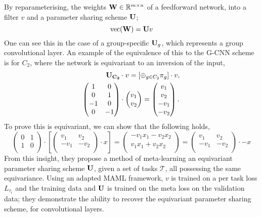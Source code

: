 By reparameterising, the weights $\mathbf{W} \in \mathbb{R}^{m \times n}$ of a feedforward network, into a filter $v$ and a parameter sharing scheme $\mathbf{U}$;
\begin{equation}
	\text{vec}(\mathbf{W}) = \mathbf{U}v
\end{equation}
One can see this in the case of a group-specific $\mathbf{U}_g$, which represents a group convolutional layer.
An example of the equivalence of this to the G-CNN scheme is for $C_2$, where the network is equivariant to an inversion of the input,
\begin{align}
	\mathbf{U_{C_2}}   & \cdot v  = [\oplus_{g \in C_2} \pi_g] \cdot v, \\
	\begin{pmatrix}
		1  & 0  \\
		0  & 1  \\
		-1 & 0  \\
		0  & -1 \\
	\end{pmatrix} & \cdot
	\begin{pmatrix}
		v_1 \\
		v_2 \\
	\end{pmatrix}
	= \begin{pmatrix}
		  v_1  \\
		  v_2  \\
		  -v_1 \\
		  -v_2 \\
	  \end{pmatrix}.
\end{align}
To prove this is equivariant, we can show that the following holds,
\begin{equation}
	\begin{pmatrix}
		0 & 1 \\
		1 & 0 \\
	\end{pmatrix} \cdot \left[
		\begin{pmatrix}
			v_1  & v_2  \\
			-v_1 & -v_2 \\
		\end{pmatrix} \cdot x \right] = \begin{pmatrix}
		-v_1 x_1 - v_2 x_2 \\
		v_1 x_1 + v_2 x_2  \\
	\end{pmatrix}
	= \begin{pmatrix}
		v_1  & v_2  \\
		-v_1 & -v_2 \\
	\end{pmatrix} \cdot  -x
\end{equation}
From this insight, they propose a method of meta-learning an equivariant parameter sharing scheme $\mathbf{U}$, given a set of tasks $\mathcal{T}$, all possessing the same equivariance.
Using an adapted MAML framework, $v$ is trained on a per task loss $L_{\tau_i}$ and the training data and $\mathbf{U}$ is trained on the meta loss on the validation data; they demonstrate the ability to recover the equivariant parameter sharing scheme, for convolutional layers.


